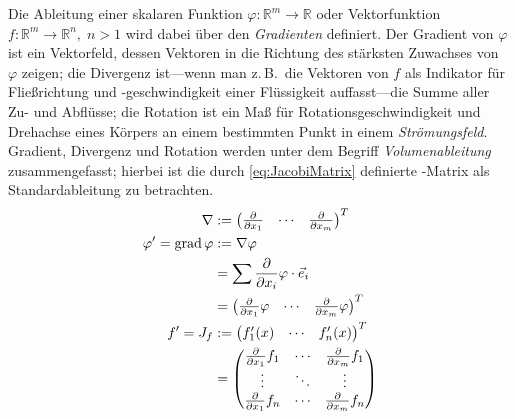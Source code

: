 Die Ableitung einer skalaren Funktion $\varphi : \mathbb{R}^m \to \mathbb{R}$ oder Vektorfunktion $f : \mathbb{R}^m \to \mathbb{R}^n,\; n>1$ wird dabei über den \emph{Gradienten} definiert.
Der Gradient von $\varphi$ ist ein Vektorfeld, dessen Vektoren in die Richtung des stärksten Zuwachses von $\varphi$ zeigen; die Divergenz ist---wenn man z.\,B.~die Vektoren von $f$ als Indikator für Fließrichtung und -geschwindigkeit einer Flüssigkeit auffasst---die Summe aller Zu- und Abflüsse; die Rotation ist ein Maß für Rotationsgeschwindigkeit und Drehachse eines Körpers an einem bestimmten Punkt in einem \emph{Strömungsfeld}.
Gradient, Divergenz und Rotation werden unter dem Begriff \emph{Volumenableitung} zusammengefasst; hierbei ist die durch \cref{eq:JacobiMatrix} definierte -Matrix als Standardableitung zu betrachten.
\begin{align}
\nabla  &:= \begin{pmatrix}
    \frac{\partial}{\partial x_1} & \cdots & \frac{\partial}{\partial x_m}
\end{pmatrix}^T \nonumber\\
\varphi' = \operatorname{grad} \varphi &:= \nabla \varphi \nonumber\\
                         & = \sum \frac{\partial}{\partial x_i} \varphi \cdot \vec e_i \nonumber\\
                         & = \begin{pmatrix}
                                 \frac{\partial}{\partial x_1} \varphi & \cdots & \frac{\partial}{\partial x_m} \varphi
                             \end{pmatrix}^T \nonumber\\
                f' = J_f &:= \begin{pmatrix}
                                 f'_1(x) & \cdots & f'_n(x)
                             \end{pmatrix}^T \label{eq:JacobiMatrix} \\
                         & = \begin{pmatrix}
                                 \frac{\partial}{\partial x_1} f_1 & \cdots & \frac{\partial}{\partial x_m} f_1 \\
                                 \vdots                            & \ddots & \vdots                            \\
                                 \frac{\partial}{\partial x_1} f_n & \cdots & \frac{\partial}{\partial x_m} f_n
                             \end{pmatrix} \nonumber
\end{align}

